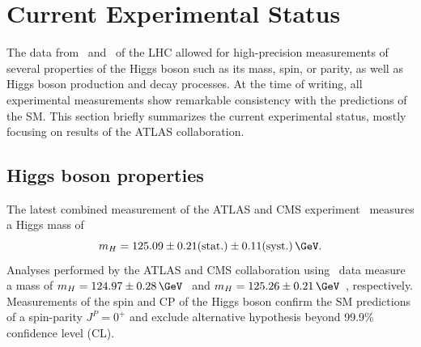 



\section{Current Experimental Status}
\label{subsec:higgs-exp-status}
The data from \RunOne\ and \RunTwo\ of the LHC allowed for high-precision measurements of several properties of the Higgs boson such as its mass, spin, or parity, as well as Higgs boson production and decay processes. 
At the time of writing, all experimental measurements show remarkable consistency with the predictions of the SM.
This section briefly summarizes the current experimental status, mostly focusing on results of the ATLAS collaboration.

\subsection{Higgs boson properties}
The latest combined measurement of the ATLAS and CMS experiment~\cite{HIGG-2014-14} measures a Higgs mass of 
\begin{equation}
  m_H = 125.09 \pm 0.21\text{(stat.)} \pm 0.11\text{(syst.)}\,\GeV.
\end{equation}
Analyses performed by the ATLAS and CMS collaboration using \RunTwo\ data measure a mass of $m_H = 124.97\pm0.28\,\GeV$~\cite{ATLAS-CONF-2017-046} and $m_H = 125.26 \pm 0.21\,\GeV$~\cite{Sirunyan_2020}, respectively.
Measurements of the spin and CP of the Higgs boson confirm the SM predictions of a spin-parity $J^P = 0^+$ and exclude alternative hypothesis beyond 99.9\% confidence level (CL).~\cite{HIGG-2013-17-witherratum,CMS-HIG-14-018} 

